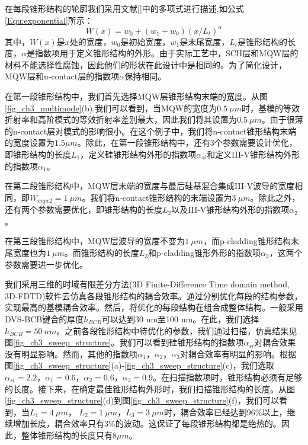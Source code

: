 在每段锥形结构的轮廓我们采用文献[]中的多项式进行描述,如公式\ref{Equ:exponential}所示：
\begin{equation}
\label{Equ:exponential}
W(x) = w_0+(w_1+w_0)\left(x/L_t\right)^\alpha
\end{equation}
其中，$W(x)$是$x$处的宽度，$w_0$是初始宽度，$w_1$是末尾宽度，$L_t$是锥形结构的长度，$\alpha$是指数项用于定义锥形结构的外形。由于实际工艺中，SCH层和MQW层的材料不能选择性腐蚀，因此他们的形状在此设计中是相同的。为了简化设计，MQW层和n-contact层的指数项$\alpha$保持相同。

在第一段锥形结构中，我们首先选择MQW层锥形结构末端的宽度。从图\ref{fig_ch3_multimode}(b),我们可以看到，当MQW的宽度为$0.5 ~ \mu m$时，基模的等效折射率和高阶模式的等效折射率差别最大，因此我们将其设置为$0.5 ~ \mu m$。由于很薄的n-contact层对模式的影响很小。在这个例子中，我们将n-contact锥形结构末端的宽度设置为$1.5 \mu m$。除此，在第一段锥形结构中，还有3个参数需要设计优化，即锥形结构的长度$L_1$，定义硅锥形结构外形的指数项$\alpha_{si}$和定义III-V锥形结构外形的指数项$\alpha_1$。

在第二段锥形结构中，MQW层末端的宽度与最后硅基混合集成III-V波导的宽度相同，即$W_{mqw2} = 1~\mu m$。我们将n-contact锥形结构的末端设置为$3~\mu m$。除此之外，还有两个参数需要优化，即锥形结构的长度$L_2$以及III-V锥形结构外形的指数项$\alpha_2$。

在第三段锥形结构中，MQW层波导的宽度不变为$1~\mu m$，而p-cladding锥形结构末尾宽度也为$1~\mu m$。而锥形结构的长度$L_3$和p-cladding锥形外形的指数项$\alpha_3$，这两个参数需要进一步优化。

我们采用三维的时域有限差分方法(3D Finite-Difference Time domain method, 3D-FDTD)软件去仿真各段锥形结构的耦合效率\cite{fdtdsolution}。通过分别优化每段的结构参数，实现最高的基模耦合效率。然后，将优化的每段结构在组合成整体结构。一般采用DVS-BCB键合的厚度$h_{BCB}$可以达到30 nm至100 nm。在此，我们选择$h_{BCB} = 50~nm$。之前各段锥形结构中待优化的参数，我们通过扫描，仿真结果见图\ref{fig_ch3_sweep_structure}。我们可以看到硅锥形结构的指数项$\alpha_{si}$对耦合效果没有明显影响。然而，其他的指数项$\alpha_1$，$\alpha_2$，$\alpha_3$对耦合效率有明显的影响。根据图\ref{fig_ch3_sweep_structure}(a)-\ref{fig_ch3_sweep_structure}(c)，我们选取$\alpha_{si} = 2.2$，$\alpha_1 = 0.6$，$\alpha_2 = 0.6$，$ \alpha_3 = 0.9$。在扫描指数项时，锥形结构必须有足够的长度。接下来，在确定最佳锥形结构外形时，我们扫描锥形结构的长度。从图\ref{fig_ch3_sweep_structure}(d)到图\ref{fig_ch3_sweep_structure}(f)，我们可以看到，当$L_1 = 4~ \mu m$， $L_2 = 1~\mu m$，$ L_3 =  3~\mu m $时，耦合效率已经达到96\%以上，继续增加长度，耦合效率只有3\%的波动。这保证了每段锥形结构都是绝热的。因此，整体锥形结构的长度只$有8 \mu m$。

